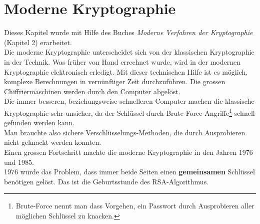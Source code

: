 \newpage
\section{Moderne Kryptographie}
Dieses Kapitel wurde mit Hilfe des Buches \textit{Moderne Verfahren der Kryptographie} (Kapitel 2) erarbeitet.\\[2ex]
Die moderne Kryptographie unterscheidet sich von der klassischen Kryptographie in der Technik. Was früher von Hand errechnet wurde, wird in der modernen Kryptographie elektronisch erledigt. Mit dieser technischen Hilfe ist es möglich, komplexe Berechnungen in vernünftiger Zeit durchzuführen. Die grossen Chiffriermaschinen werden durch den Computer abgelöst.\\
Die immer besseren, beziehungsweise schnelleren Computer machen die klassische Kryptographie sehr unsicher, da der Schlüssel durch Brute-Force-Angriffe\footnote{Brute-Force nennt man dass Vorgehen, ein Passwort durch Ausprobieren aller möglichen Schlüssel zu knacken.} schnell gefunden werden kann.\\
Man brauchte also sichere Verschlüsselungs-Methoden, die durch Ausprobieren nicht geknackt werden konnten.\\
Einen grossen Fortschritt machte die moderne Kryptographie in den Jahren 1976 und 1985.\\
1976 wurde das Problem, dass immer beide Seiten einen \textbf{gemeinsamen} Schlüssel benötigen gelöst. Das ist die Geburtsstunde des RSA-Algorithmus.
%
